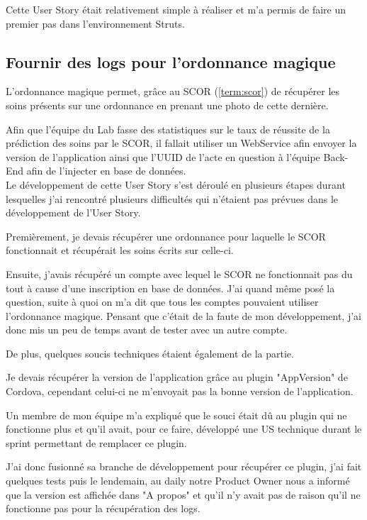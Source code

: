 \documentclass{article}
\begin{document}
Cette User Story était relativement simple à réaliser et m'a permis de faire un premier pas dans l'environnement Struts.

\subsection{Fournir des logs pour l'ordonnance magique}

L'ordonnance magique permet, grâce au SCOR (\ref{term:scor}) de récupérer les soins présents sur une ordonnance en prenant une photo de cette dernière.

Afin que l'équipe du Lab fasse des statistiques sur le taux de réussite de la prédiction des soins par le SCOR, il fallait utiliser un WebService afin envoyer la version de l'application ainsi que l'UUID de l'acte en question à l'équipe Back-End afin de l'injecter en base de données. \\

Le développement de cette User Story s'est déroulé en plusieurs étapes durant lesquelles j'ai rencontré plusieurs difficultés qui n'étaient pas prévues dans le développement de l'User Story.

Premièrement, je devais récupérer une ordonnance pour laquelle le SCOR fonctionnait et récupérait les soins écrits sur celle-ci.

Ensuite, j'avais récupéré un compte avec lequel le SCOR ne fonctionnait pas du tout à cause d'une inscription en base de données. J'ai quand même posé la question, suite à quoi on m'a dit que tous les comptes pouvaient utiliser l'ordonnance magique. Pensant que c'était de la faute de mon développement, j'ai donc mis un peu de temps avant de tester avec un autre compte.

De plus, quelques soucis techniques étaient également de la partie.

Je devais récupérer la version de l'application grâce au plugin "AppVersion" de Cordova, cependant celui-ci ne m'envoyait pas la bonne version de l'application.

Un membre de mon équipe m'a expliqué que le souci était dû au plugin qui ne fonctionne plus et qu'il avait, pour ce faire, développé une US technique durant le sprint permettant de remplacer ce plugin.

J'ai donc fusionné sa branche de développement pour récupérer ce plugin, j'ai fait quelques tests puis le lendemain, au daily notre Product Owner nous a informé que la version est affichée dans "A propos" et qu'il n'y avait pas de raison qu'il ne fonctionne pas pour la récupération des logs.
\end{document}
